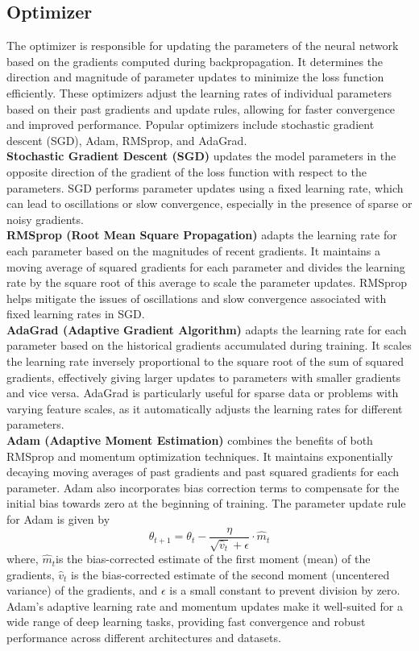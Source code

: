 \subsection{Optimizer}
The optimizer is responsible for updating the parameters of the neural network based on the gradients computed during backpropagation. It determines the direction and magnitude of parameter updates to minimize the loss function efficiently. These optimizers adjust the learning rates of individual parameters based on their past gradients and update rules, allowing for faster convergence and improved performance. Popular optimizers include stochastic gradient descent (SGD), Adam, RMSprop, and AdaGrad. \\
\textbf{Stochastic Gradient Descent (SGD)} updates the model parameters in the opposite direction of the gradient of the loss function with respect to the parameters. SGD performs parameter updates using a fixed learning rate, which can lead to oscillations or slow convergence, especially in the presence of sparse or noisy gradients.\\
\textbf{RMSprop (Root Mean Square Propagation)} adapts the learning rate for each parameter based on the magnitudes of recent gradients. It maintains a moving average of squared gradients for each parameter and divides the learning rate by the square root of this average to scale the parameter updates. RMSprop helps mitigate the issues of oscillations and slow convergence associated with fixed learning rates in SGD.\\
\textbf{AdaGrad (Adaptive Gradient Algorithm)} adapts the learning rate for each parameter based on the historical gradients accumulated during training. It scales the learning rate inversely proportional to the square root of the sum of squared gradients, effectively giving larger updates to parameters with smaller gradients and vice versa. AdaGrad is particularly useful for sparse data or problems with varying feature scales, as it automatically adjusts the learning rates for different parameters.\\
\textbf{Adam (Adaptive Moment Estimation)} combines the benefits of both RMSprop and momentum optimization techniques. It maintains exponentially decaying moving averages of past gradients and past squared gradients for each parameter. Adam also incorporates bias correction terms to compensate for the initial bias towards zero at the beginning of training. The parameter update rule for Adam is given by
\begin{equation}
    \theta_{t+1}=\theta_t-\frac{\eta}{\sqrt{\hat{v}_t}+\epsilon} \cdot \hat{m}_t
    \end{equation}
where, $\hat{m}_t$is the bias-corrected estimate of the first moment (mean) of the gradients, $\hat{v}_t$ is the bias-corrected estimate of the second moment (uncentered variance) of the gradients, and $\epsilon$ is a small constant to prevent division by zero. Adam's adaptive learning rate and momentum updates make it well-suited for a wide range of deep learning tasks, providing fast convergence and robust performance across different architectures and datasets.

